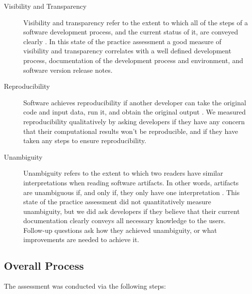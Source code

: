 \documentclass[final, 3p, times, authoryear]{elsarticle}
\begin{document}
\begin{description}
	\item[Visibility and Transparency] Visibility and transparency refer to the
	extent to which all of the steps of a software development process, and the
	current status of it, are conveyed clearly \citep[p.\ 32]{GhezziEtAl2003}.
	In this state of the practice assessment a good measure of visibility and
	transparency correlates with a well defined development process,
	documentation of the development process and environment, and software
	version release notes.
	
	\item[Reproducibility] Software achieves reproducibility if another
	developer can take the original code and input data, run it, and obtain the
	original output \citep{BenureauAndRougier2017}. We measured reproducibility
	qualitatively by asking developers if they have any concern that their
	computational results won't be reproducible, and if they have taken any
	steps to ensure reproducibility.
	
	\item[Unambiguity] Unambiguity refers to the extent to which two readers
	have similar interpretations when reading software artifacts. In other
	words, artifacts are unambiguous if, and only if, they only have one
	interpretation \citep{IEEE1998}. This state of the practice assessment did
	not quantitatively measure unambiguity, but we did ask developers if they
	believe that their current documentation clearly conveys all necessary
	knowledge to the users.  Follow-up questions ask how they achieved
	unambiguity, or what improvements are needed to achieve it.
				 
\end{description}

\subsection{Overall Process} \label{Sec_OverallProcess}

The assessment was conducted via the following steps: 
\end{document}
